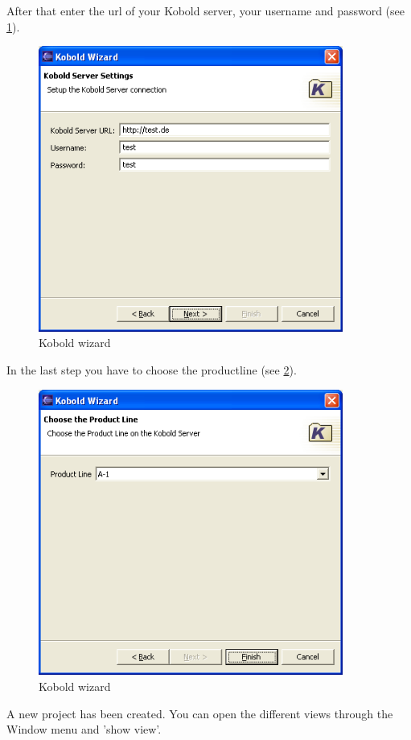 After that enter the url of your Kobold server, your username and password (see \ref{wizard2}).

\begin{figure}[h!]
\begin{center}
\includegraphics[width=10cm]{wizard2.png}
   \caption{Kobold wizard}
\label{wizard2}
\end{center}
\end{figure}\par

In the last step you have to choose the productline (see \ref{wizard3}).

\begin{figure}[h!]
\begin{center}
\includegraphics[width=10cm]{wizard3.png}
   \caption{Kobold wizard}
\label{wizard3}
\end{center}
\end{figure}\par

A new project has been created. You can open the different views through the Window menu
and 'show view'. 